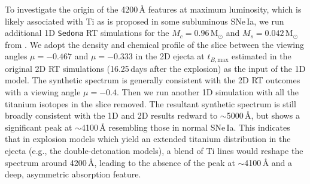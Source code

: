 \documentclass[twocolumn]{aastex631}
\begin{document}
\begin{CJK*}{UTF8}{gbsn}
To investigate the origin of the 4200\,\r{A} features at maximum luminosity, which is likely associated with Ti as is proposed in some subluminous SNe\,Ia, we run additional 1D \texttt{Sedona} RT simulations for the $M_c=0.96\,\mathrm{M_\odot}$ and $M_s=0.042\,\mathrm{M_\odot}$ from \citet[adopted in the calculations of \citealp{Shen_2D_2021}]{Boos_2021}. We adopt the density and chemical profile of the slice between the viewing angles $\mu=-0.467$ and $\mu=-0.333$ in the 2D ejecta at $t_{B,\mathrm{max}}$ estimated in the original 2D RT simulations (16.25\,days after the explosion) as the input of the 1D model. The synthetic spectrum is generally consistent with the 2D RT outcomes with a viewing angle $\mu=-0.4$. Then we run another 1D simulation with all the titanium isotopes in the slice removed. The resultant synthetic spectrum is still broadly consistent with the 1D and 2D results redward to $\sim$5000\,\r{A}, but shows a significant peak at $\sim$4100\,\r{A} resembling those in normal SNe\,Ia. This indicates that in explosion models which yield an extended titanium distribution in the ejecta (e.g., the double-detonation models), a blend of Ti lines would reshape the spectrum around 4200\,\r{A}, leading to the absence of the peak at $\sim$4100\,\r{A} and a deep, asymmetric absorption feature. %


\end{CJK*}
\end{document}
